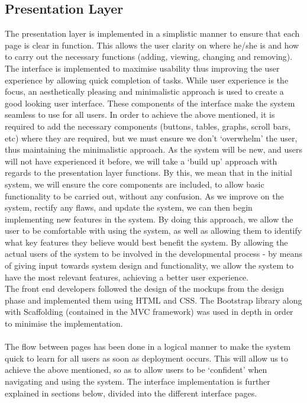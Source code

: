 \documentclass[paper=a4, fontsize=11pt]{scrartcl}
\numberwithin{equation}{section}		%
\numberwithin{figure}{section}			%
\numberwithin{table}{section}				%
\begin{document}
\subsection{Presentation Layer}
The presentation layer is implemented in a simplistic manner to ensure that each page is clear in function. This allows the user clarity on where he/she is and how to carry out the necessary functions (adding, viewing, changing and removing). The interface is implemented to maximise usability thus improving the user experience by allowing quick completion of tasks. While user experience is the focus, an aesthetically pleasing and minimalistic approach is used to create a good looking user interface. These components of the interface make the system seamless to use for all users. In order to achieve the above mentioned, it is required to add the necessary components (buttons, tables, graphs, scroll bars, etc) where they are required, but we must ensure we don’t ‘overwhelm’ the user, thus maintaining the minimalistic approach. As the system will be new, and users will not have experienced it before, we will take a ‘build up’ approach with regards to the presentation layer functions. By this, we mean that in the initial system, we will ensure the core components are included, to allow basic functionality to be carried out, without any confusion. As we improve on the system, rectify any flaws, and update the system, we can then begin implementing new features in the system. By doing this approach, we allow the user to be comfortable with using the system, as well as allowing them to identify what key features they believe would best benefit the system. By allowing the actual users of the system to be involved in the developmental process - by means of giving input towards system design and functionality, we allow the system to have the most relevant features, achieving a better user experience.\\ The front end developers followed the design of the mockups from the design phase and implemented them using HTML and CSS. The Bootstrap library along with Scaffolding (contained in the MVC framework) was used in depth in order to minimise the implementation.\\\\The flow between pages has been done in a logical manner to make the system quick to learn for all users as soon as deployment occurs. This will allow us to achieve the above mentioned, so as to allow users to be ‘confident’ when navigating and using the system. The interface implementation is further explained in sections below, divided into the different interface pages.
\end{document}
